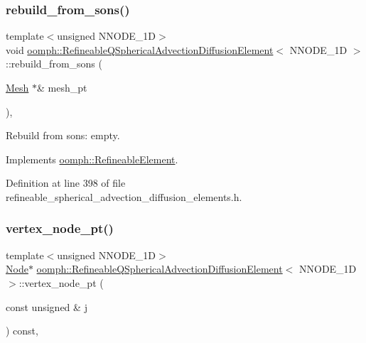 \subsubsection{\texorpdfstring{rebuild\+\_\+from\+\_\+sons()}{rebuild\_from\_sons()}}
{\footnotesize\ttfamily template$<$unsigned N\+N\+O\+D\+E\+\_\+1D$>$ \\
void \hyperlink{classoomph_1_1RefineableQSphericalAdvectionDiffusionElement}{oomph\+::\+Refineable\+Q\+Spherical\+Advection\+Diffusion\+Element}$<$ N\+N\+O\+D\+E\+\_\+1D $>$\+::rebuild\+\_\+from\+\_\+sons (\begin{DoxyParamCaption}\item[{\hyperlink{classoomph_1_1Mesh}{Mesh} $\ast$\&}]{mesh\+\_\+pt }\end{DoxyParamCaption})\hspace{0.3cm}{\ttfamily [inline]}, {\ttfamily [virtual]}}



Rebuild from sons\+: empty. 



Implements \hyperlink{classoomph_1_1RefineableElement_a33324be27833fa4b78279d17158215fa}{oomph\+::\+Refineable\+Element}.



Definition at line 398 of file refineable\+\_\+spherical\+\_\+advection\+\_\+diffusion\+\_\+elements.\+h.

\mbox{\label{classoomph_1_1RefineableQSphericalAdvectionDiffusionElement_af835676dba7c709266afe91006465b97}} 
\subsubsection{\texorpdfstring{vertex\+\_\+node\+\_\+pt()}{vertex\_node\_pt()}}
{\footnotesize\ttfamily template$<$unsigned N\+N\+O\+D\+E\+\_\+1D$>$ \\
\hyperlink{classoomph_1_1Node}{Node}$\ast$ \hyperlink{classoomph_1_1RefineableQSphericalAdvectionDiffusionElement}{oomph\+::\+Refineable\+Q\+Spherical\+Advection\+Diffusion\+Element}$<$ N\+N\+O\+D\+E\+\_\+1D $>$\+::vertex\+\_\+node\+\_\+pt (\begin{DoxyParamCaption}\item[{const unsigned \&}]{j }\end{DoxyParamCaption}) const\hspace{0.3cm}{\ttfamily [inline]}, {\ttfamily [virtual]}}



